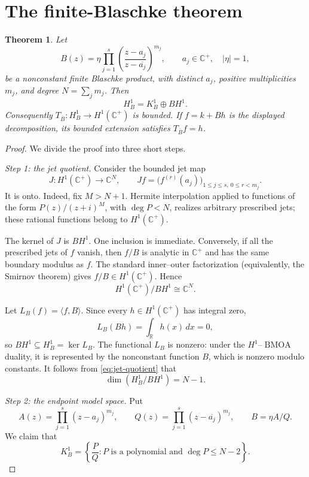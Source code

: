 \documentclass[11pt]{article}
\newtheorem{theorem}{Theorem}
\newcommand{\C}{\mathbb C}
\newcommand{\R}{\mathbb R}
\newcommand{\Hone}{H^1(\C^+)}
\newcommand{\BMOA}{\operatorname{BMOA}}
\begin{document}
\section*{The finite-Blaschke theorem}

\begin{theorem}\label{thm:main}
Let
\[
 B(z)=\eta\prod_{j=1}^{s}
 \left(\frac{z-a_j}{z-\overline{a_j}}\right)^{m_j},
 \qquad a_j\in\C^+,\quad |\eta|=1,
\]
be a nonconstant finite Blaschke product, with distinct $a_j$, positive
multiplicities $m_j$, and degree $N=\sum_jm_j$.  Then
\[
 H^1_B=K^1_B\oplus BH^1.
\]
Consequently $T_{\overline B}:H^1_B\to\Hone$ is bounded.  If
$f=k+Bh$ is the displayed decomposition, its bounded extension satisfies
$T_{\overline B}f=h$.
\end{theorem}

\begin{proof}
We divide the proof into three short steps.

\emph{Step 1: the jet quotient.}
Consider the bounded jet map
\[
 J:\Hone\longrightarrow\C^N,
 \qquad
 Jf=\bigl(f^{(r)}(a_j)\bigr)_{1\leq j\leq s,\ 0\leq r<m_j}.
\]
It is onto.  Indeed, fix $M>N+1$.  Hermite interpolation applied to
functions of the form $P(z)/(z+i)^M$, with $\deg P<N$, realizes arbitrary
prescribed jets; these rational functions belong to $\Hone$.

The kernel of $J$ is $BH^1$.  One inclusion is immediate.  Conversely, if all
the prescribed jets of $f$ vanish, then $f/B$ is analytic in $\C^+$ and has
the same boundary modulus as $f$.  The standard inner--outer factorization
(equivalently, the Smirnov theorem) gives $f/B\in\Hone$.  Hence
\begin{equation}\label{eq:jet-quotient}
 \Hone/BH^1\cong\C^N.
\end{equation}

Let $L_B(f)=\langle f,B\rangle$.  Since every $h\in\Hone$ has integral zero,
\[
 L_B(Bh)=\int_{\R}h(x)\,dx=0,
\]
so $BH^1\subseteq H^1_B=\ker L_B$.  The functional $L_B$ is nonzero: under
the $H^1$--$\BMOA$ duality, it is represented by the nonconstant function
$B$, which is nonzero modulo constants.  It follows from
\eqref{eq:jet-quotient} that
\begin{equation}\label{eq:hyperplane-dimension}
 \dim(H^1_B/BH^1)=N-1.
\end{equation}

\emph{Step 2: the endpoint model space.}
Put
\[
 A(z)=\prod_{j=1}^{s}(z-a_j)^{m_j},
 \qquad
 Q(z)=\prod_{j=1}^{s}(z-\overline{a_j})^{m_j},
 \qquad B=\eta A/Q.
\]
We claim that
\begin{equation}\label{eq:model-description}
 K^1_B=\left\{\frac{P}{Q}: P\text{ is a polynomial and }
                              \deg P\leq N-2\right\}.
\end{equation}


\end{proof}
\end{document}
